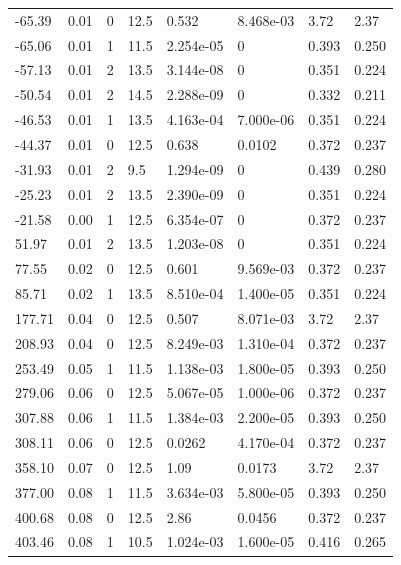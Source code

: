 \documentclass[preview]{standalone}
\begin{document}
{{\begin{tabular}{L{1.2cm}C{1.2cm} C{0.3cm}C{0.5cm} C{1.4cm}C{1.4cm} C{1.4cm}C{1.4cm}}
  -65.39  &  0.01  & 0     & 12.5 &  0.532  & 8.468e-03  & 3.72 &  2.37   \\ 
  -65.06  &  0.01  & 1     & 11.5 &  2.254e-05  & 0  & 0.393 &  0.250   \\ 
  -57.13  &  0.01  & 2     & 13.5 &  3.144e-08  & 0  & 0.351 &  0.224   \\ 
  -50.54  &  0.01  & 2     & 14.5 &  2.288e-09  & 0  & 0.332 &  0.211   \\ 
  -46.53  &  0.01  & 1     & 13.5 &  4.163e-04  & 7.000e-06  & 0.351 &  0.224   \\ 
  -44.37  &  0.01  & 0     & 12.5 &  0.638  & 0.0102  & 0.372 &  0.237   \\ 
  -31.93  &  0.01  & 2     & 9.5 &  1.294e-09  & 0  & 0.439 &  0.280   \\ 
  -25.23  &  0.01  & 2     & 13.5 &  2.390e-09  & 0  & 0.351 &  0.224   \\ 
  -21.58  &  0.00  & 1     & 12.5 &  6.354e-07  & 0  & 0.372 &  0.237   \\ 
  51.97  &  0.01  & 2     & 13.5 &  1.203e-08  & 0  & 0.351 &  0.224   \\ 
  77.55  &  0.02  & 0     & 12.5 &  0.601  & 9.569e-03  & 0.372 &  0.237   \\ 
  85.71  &  0.02  & 1     & 13.5 &  8.510e-04  & 1.400e-05  & 0.351 &  0.224   \\ 
  177.71  &  0.04  & 0     & 12.5 &  0.507  & 8.071e-03  & 3.72 &  2.37   \\ 
  208.93  &  0.04  & 0     & 12.5 &  8.249e-03  & 1.310e-04  & 0.372 &  0.237   \\ 
  253.49  &  0.05  & 1     & 11.5 &  1.138e-03  & 1.800e-05  & 0.393 &  0.250   \\ 
  279.06  &  0.06  & 0     & 12.5 &  5.067e-05  & 1.000e-06  & 0.372 &  0.237   \\ 
  307.88  &  0.06  & 1     & 11.5 &  1.384e-03  & 2.200e-05  & 0.393 &  0.250   \\ 
  308.11  &  0.06  & 0     & 12.5 &  0.0262  & 4.170e-04  & 0.372 &  0.237   \\ 
  358.10  &  0.07  & 0     & 12.5 &  1.09  & 0.0173  & 3.72 &  2.37   \\ 
  377.00  &  0.08  & 1     & 11.5 &  3.634e-03  & 5.800e-05  & 0.393 &  0.250   \\ 
  400.68  &  0.08  & 0     & 12.5 &  2.86  & 0.0456  & 0.372 &  0.237   \\ 
  403.46  &  0.08  & 1     & 10.5 &  1.024e-03  & 1.600e-05  & 0.416 &  0.265   \\ 

\end{tabular}}}
\end{document}
